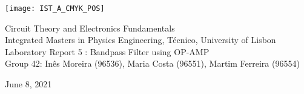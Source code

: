 
\thispagestyle {empty}

\texttt{[image: IST\_A\_CMYK\_POS]}

\begin{center}
%
\vspace{1.0cm}

\vspace{1cm}
{\FontLb Circuit Theory and Electronics Fundamentals} \\ %
\vspace{1cm}
{\FontSn Integrated Masters in Physics Engineering, Técnico, University of Lisbon} \\ %
\vspace{1cm}
{\FontSn Laboratory Report 5 : Bandpass Filter using OP-AMP} \\
\vspace{1cm}
{\FontSn Group 42: Inês Moreira (96536), Maria Costa (96551), Martim Ferreira (96554)}
\vspace{1cm}
\par
{\FontSn June 8, 2021} \\ %
\vspace{1cm}
%
\end{center}

